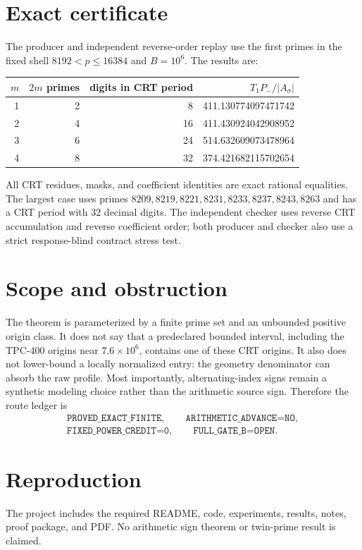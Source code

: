\documentclass[11pt]{article}
\begin{document}
\section{Exact certificate}
The producer and independent reverse-order replay use the first primes in the
fixed shell $8192<p\le16384$ and $B=10^6$.  The results are:
\begin{center}
\begin{tabular}{@{}rrrr@{}}
\toprule
$m$ & $2m$ primes & digits in CRT period & $T_1P_-/|A_\sigma|$\\
\midrule
1&2&8&411.130774097471742\\
2&4&16&411.430924042908952\\
3&6&24&514.632609073478964\\
4&8&32&374.421682115702654\\
\bottomrule
\end{tabular}
\end{center}
All CRT residues, masks, and coefficient identities are exact rational
equalities.  The largest case uses primes
$8209,8219,8221,8231,8233,8237,8243,8263$ and has a CRT period with 32
decimal digits.  The independent checker uses reverse CRT accumulation and
reverse coefficient order; both producer and checker also use a strict
response-blind contract stress test.

\section{Scope and obstruction}
The theorem is parameterized by a finite prime set and an unbounded positive
origin class.  It does not say that a predeclared bounded interval, including
the TPC-400 origins near $7.6\times10^6$, contains one of these CRT origins.
It also does not lower-bound a locally normalized entry: the geometry
denominator can absorb the raw profile.  Most importantly, alternating-index
signs remain a synthetic modeling choice rather than the arithmetic source
sign.  Therefore the route ledger is
\[
\begin{gathered}
\texttt{PROVED\_EXACT\_FINITE},\qquad
\texttt{ARITHMETIC\_ADVANCE=NO},\\
\texttt{FIXED\_POWER\_CREDIT=0},\qquad
\texttt{FULL\_GATE\_B=OPEN}.
\end{gathered}
\]

\section*{Reproduction}
The project includes the required README, code, experiments, results, notes,
proof package, and PDF.  No arithmetic sign theorem or twin-prime result is
claimed.
\end{document}
